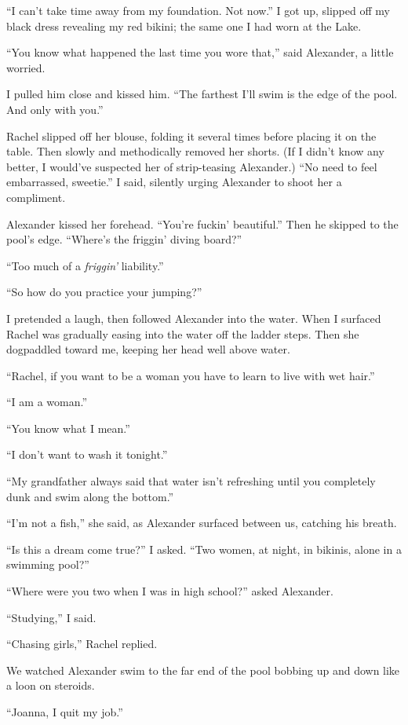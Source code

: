 ``I can't take time away from my foundation. Not now.'' I got up,
slipped off my black dress revealing my red bikini; the same one I had
worn at the Lake.

``You know what happened the last time you wore that,'' said Alexander,
a little worried.

I pulled him close and kissed him. ``The farthest I'll swim is the edge
of the pool. And only with you.''

Rachel slipped off her blouse, folding it several times before placing
it on the table. Then slowly and methodically removed her shorts. (If I
didn't know any better, I would've suspected her of strip-teasing
Alexander.) ``No need to feel embarrassed, sweetie.'' I said, silently
urging Alexander to shoot her a compliment.

Alexander kissed her forehead. ``You're fuckin' beautiful.'' Then he
skipped to the pool's edge. ``Where's the friggin' diving board?''

``Too much of a \emph{friggin'} liability.''

``So how do you practice your jumping?''

I pretended a laugh, then followed Alexander into the water. When I
surfaced Rachel was gradually easing into the water off the ladder
steps. Then she dogpaddled toward me, keeping her head well above water.

``Rachel, if you want to be a woman you have to learn to live with wet
hair.''

``I am a woman.''

``You know what I mean.''

``I don't want to wash it tonight.''

``My grandfather always said that water isn't refreshing until you
completely dunk and swim along the bottom.''

``I'm not a fish,'' she said, as Alexander surfaced between us, catching
his breath.

``Is this a dream come true?'' I asked. ``Two women, at night, in
bikinis, alone in a swimming pool?''

``Where were you two when I was in high school?'' asked Alexander.

``Studying,'' I said.

``Chasing girls,'' Rachel replied.

We watched Alexander swim to the far end of the pool bobbing up and down
like a loon on steroids.

``Joanna, I quit my job.''

